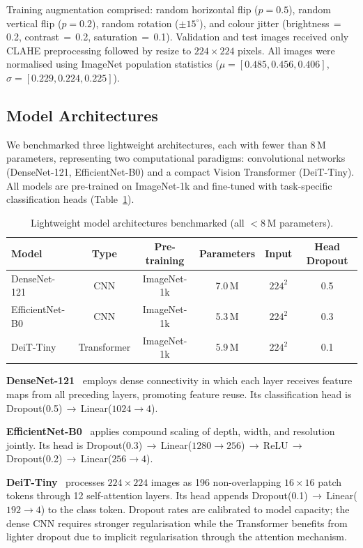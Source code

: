 \documentclass[11pt,a4paper]{article}
\begin{document}
Training augmentation comprised: random horizontal flip ($p=0.5$), random
vertical flip ($p=0.2$), random rotation ($\pm15^{\circ}$), and colour
jitter (brightness\,$=$\,0.2, contrast\,$=$\,0.2, saturation\,$=$\,0.1).
Validation and test images received only CLAHE preprocessing followed by
resize to $224\times224$ pixels. All images were normalised using ImageNet
population statistics ($\mu=[0.485, 0.456, 0.406]$,
$\sigma=[0.229, 0.224, 0.225]$).

\subsection{Model Architectures}
\label{sec:models}

We benchmarked three lightweight architectures, each with fewer than 8\,M
parameters, representing two computational paradigms: convolutional networks
(DenseNet-121, EfficientNet-B0) and a compact Vision Transformer (DeiT-Tiny).
All models are pre-trained on ImageNet-1k and fine-tuned with task-specific
classification heads (Table~\ref{tab:archs}).

\begin{table}[H]
\centering
\caption{Lightweight model architectures benchmarked (all $<$8\,M parameters).}
\label{tab:archs}
\begin{tabular}{lccccc}
\toprule
\textbf{Model} & \textbf{Type} & \textbf{Pre-training} &
\textbf{Parameters} & \textbf{Input} & \textbf{Head Dropout}\\
\midrule
DenseNet-121    & CNN         & ImageNet-1k & 7.0\,M & $224^2$ & 0.5\\
EfficientNet-B0 & CNN         & ImageNet-1k & 5.3\,M & $224^2$ & 0.3\\
DeiT-Tiny       & Transformer & ImageNet-1k & 5.9\,M & $224^2$ & 0.1\\
\bottomrule
\end{tabular}
\end{table}

\textbf{DenseNet-121}~\citep{Huang2017} employs dense connectivity in which
each layer receives feature maps from all preceding layers, promoting feature
reuse. Its classification head is Dropout(0.5)\,$\to$\,Linear($1024\!\to\!4$).

\textbf{EfficientNet-B0}~\citep{Tan2019} applies compound scaling of depth,
width, and resolution jointly. Its head is
Dropout(0.3)\,$\to$\,Linear($1280\!\to\!256$)\,$\to$\,ReLU\,$\to$\,
Dropout(0.2)\,$\to$\,Linear($256\!\to\!4$).

\textbf{DeiT-Tiny}~\citep{Touvron2021} processes $224\times224$ images as
196 non-overlapping $16\times16$ patch tokens through 12 self-attention
layers. Its head appends Dropout(0.1)\,$\to$\,Linear($192\!\to\!4$) to the
class token. Dropout rates are calibrated to model capacity; the dense CNN
requires stronger regularisation while the Transformer benefits from lighter
dropout due to implicit regularisation through the attention mechanism.
\end{document}
